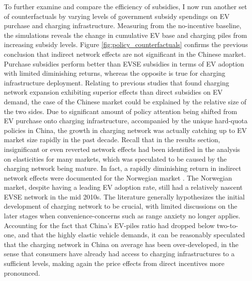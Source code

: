 \documentclass[12pt]{article}
\begin{document}
To further examine and compare the efficiency of subsidies, I now run another set of counterfactuals by varying levels of government subsidy spendings on EV purchase and charging infrastructure.
Measuring from the no-incentive baseline, the simulations reveals the change in cumulative EV base and charging piles from increasing subsidy levels.
Figure \ref{fig:policy_counterfactuals} confirms the previous conclusion that indirect network effects are not significant in the Chinese market. 
Purchase subsidies perform better than EVSE subsidies in terms of EV adoption with limited diminishing returns,
whereas the opposite is true for charging infrastructure deployment. 
Relating to previous studies that found charging network expansion exhibiting superior effects than direct subsidies on EV demand, 
the case of the Chinese market could be explained by the relative size of the two sides.
Due to significant amount of policy attention being shifted from EV purchase onto charging infrastructure,
accompanied by the unique hard-quota policies in China, the growth in charging network was actually catching up to EV market size rapidly in the past decade.
Recall that in the results section, insignificant or even reverted network effects had been identified in the analysis on elasticities for many markets,
which was speculated to be caused by the charging network being mature. In fact, a rapidly diminishing return in indirect network effects were documented for the Norwegian market \citep{springel_network_2021}.
The Norwegian market, despite having a leading EV adoption rate, still had a relatively nascent EVSE network in the mid 2010s.
The literature generally hypothesizes the initial development of charging network to be crucial, with limited discussions on the later stages when convenience-concerns such as range anxiety no longer applies.
Accounting for the fact that China's EV-piles ratio had dropped below two-to-one, and that the highly elastic vehicle demands, it can be reasonably speculated that the charging network in China on average has been over-developed,
in the sense that consumers have already had access to charging infrastructures to a sufficient levels, making again the price effects from direct incentives more pronounced.
\end{document}
